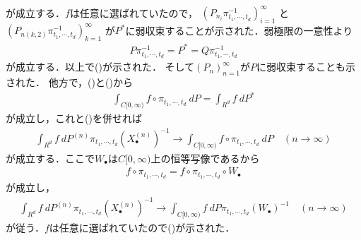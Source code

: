 \begin{sketch}
\begin{description}
\begin{align}
				\end{align}
				が成立する．$f$は任意に選ばれていたので，
				$\left(P_{n_i}\pi_{t_1,\cdots,t_d}^{-1}\right)_{i=1}^\infty$
				と$\left(P_{n(k,2)}\pi_{t_1,\cdots,t_d}^{-1}\right)_{k=1}^\infty$
				が$P^*$に弱収束することが示された．弱極限の一意性より
				\begin{align}
					P\pi_{t_1,\cdots,t_d}^{-1} = P^* = Q\pi_{t_1,\cdots,t_d}^{-1}
				\end{align}
				が成立する．以上で()が示された．
				そして$(P_n)_{n=1}^\infty$が$P$に弱収束することも示された．
				他方で，()と()から
				\begin{align}
					\int_{C[0,\infty)} f \circ \pi_{t_1,\cdots,t_d}\ dP
					= \int_{R^d} f\ dP^*
				\end{align}
				が成立し，これと()を併せれば
				\begin{align}
					\int_{R^d} f\ dP^{(n)}\pi_{t_1,\cdots,t_d} (X_\bullet^{(n)})^{-1}
					\longrightarrow \int_{C[0,\infty)} f \circ \pi_{t_1,\cdots,t_d}\ dP
					\quad (n \longrightarrow \infty)
				\end{align}
				が成立する．ここで$W_\bullet$は$C[0,\infty)$上の恒等写像であるから
				\begin{align}
					f \circ \pi_{t_1,\cdots,t_d} = f \circ \pi_{t_1,\cdots,t_d} \circ W_\bullet
				\end{align}
				が成立し，
				\begin{align}
					\int_{R^d} f\ dP^{(n)}\pi_{t_1,\cdots,t_d} (X_\bullet^{(n)})^{-1}
					\longrightarrow \int_{C[0,\infty)} f\ dP\pi_{t_1,\cdots,t_d} (W_\bullet)^{-1}
					\quad (n \longrightarrow \infty)
				\end{align}
				が従う．$f$は任意に選ばれていたので()が示された．
				\QED
		\end{description}
	\end{sketch}